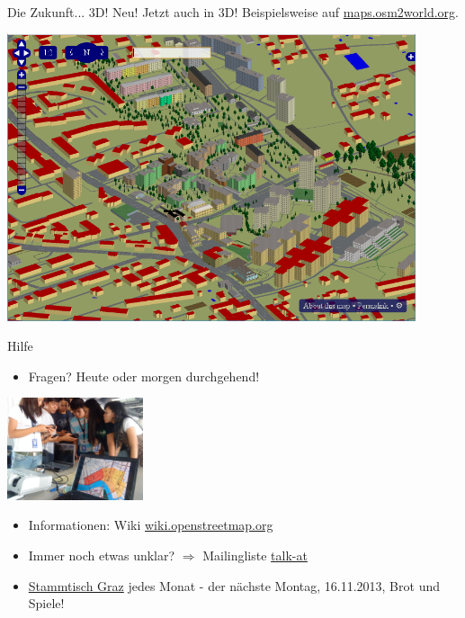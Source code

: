 \documentclass{beamer}
\begin{document}
\begin{frame}{Die Zukunft... 3D! }
  Neu! Jetzt auch in 3D! Beispielsweise auf \href{http://maps.osm2world.org/?zoom=17&lat=47.06156&lon=15.46983&layers=BF0FTFFF}{maps.osm2world.org}.

  \includegraphics[width=0.9\textwidth]{3d.png}


\end{frame}

\begin{frame}{Hilfe}

\begin{itemize}
  \item Fragen? Heute oder morgen durchgehend!
\end{itemize}
 \begin{center}
	  \includegraphics[width=4cm]{osm_workshop.jpg}
 \end{center}
\begin{itemize}
  \item Informationen: Wiki \href{http://wiki.openstreetmap.org}{wiki.openstreetmap.org}
  \item Immer noch etwas unklar? $\Rightarrow$ Mailingliste \href{http://lists.openstreetmap.org/listinfo/talk-at}{talk-at}
  \pause
  \item \href{http://wiki.openstreetmap.org/wiki/Graz/Stammtisch}{Stammtisch Graz} jedes Monat - der nächste Montag, 16.11.2013, Brot und Spiele!
\end{itemize}

\end{frame}
\end{document}
